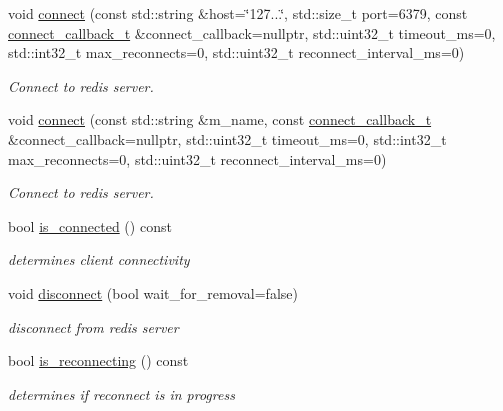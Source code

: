 \begin{DoxyCompactItemize}
void \mbox{\hyperlink{classcpp__redis_1_1subscriber_a6ae8134a9a9b31d6f2434ec4f6e86d3a}{connect}} (const std\+::string \&host=\char`\"{}127...\char`\"{}, std\+::size\+\_\+t port=6379, const \mbox{\hyperlink{classcpp__redis_1_1subscriber_a7f9e56873e5b96ad9cb2395dadae1a7a}{connect\+\_\+callback\+\_\+t}} \&connect\+\_\+callback=nullptr, std\+::uint32\+\_\+t timeout\+\_\+ms=0, std\+::int32\+\_\+t max\+\_\+reconnects=0, std\+::uint32\+\_\+t reconnect\+\_\+interval\+\_\+ms=0)
\begin{DoxyCompactList}\small\item\em Connect to redis server. \end{DoxyCompactList}\item 
void \mbox{\hyperlink{classcpp__redis_1_1subscriber_a8fb77a44a1e1f0d99dec639658e2aa7e}{connect}} (const std\+::string \&m_name, const \mbox{\hyperlink{classcpp__redis_1_1subscriber_a7f9e56873e5b96ad9cb2395dadae1a7a}{connect\+\_\+callback\+\_\+t}} \&connect\+\_\+callback=nullptr, std\+::uint32\+\_\+t timeout\+\_\+ms=0, std\+::int32\+\_\+t max\+\_\+reconnects=0, std\+::uint32\+\_\+t reconnect\+\_\+interval\+\_\+ms=0)
\begin{DoxyCompactList}\small\item\em Connect to redis server. \end{DoxyCompactList}\item 
bool \mbox{\hyperlink{classcpp__redis_1_1subscriber_af73acfc3c1859e6b32bc9a69856e6e59}{is\+\_\+connected}} () const
\begin{DoxyCompactList}\small\item\em determines client connectivity \end{DoxyCompactList}\item 
void \mbox{\hyperlink{classcpp__redis_1_1subscriber_aad1d0c3c6edb1522eb7b1bdb64b4705d}{disconnect}} (bool wait\+\_\+for\+\_\+removal=false)
\begin{DoxyCompactList}\small\item\em disconnect from redis server \end{DoxyCompactList}\item 
bool \mbox{\hyperlink{classcpp__redis_1_1subscriber_a8df4503f738566d2acab5f080cd44b53}{is\+\_\+reconnecting}} () const
\begin{DoxyCompactList}\small\item\em determines if reconnect is in progress \end{DoxyCompactList}\item 
\mbox{\label{classcpp__redis_1_1subscriber_ae93de179d6ea83ece59cf1a30493c3e9}} 

\end{DoxyCompactItemize}
